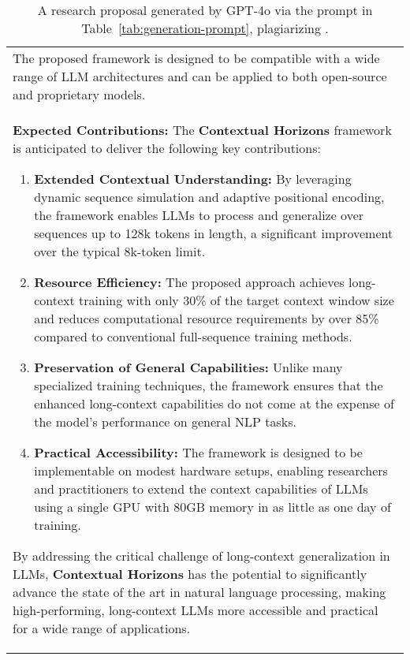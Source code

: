 \begin{table*}[t]
\begin{tabular}{|p{}|}
        The proposed framework is designed to be compatible with a wide range of LLM architectures and can be applied to both open-source and proprietary models.
        \\
        \textbf{Expected Contributions:}  
        The \textbf{Contextual Horizons} framework is anticipated to deliver the following key contributions:  
        \begin{enumerate}
            \item \textbf{Extended Contextual Understanding:} By leveraging dynamic sequence simulation and adaptive positional encoding, the framework enables LLMs to process and generalize over sequences up to 128k tokens in length, a significant improvement over the typical 8k-token limit.  
            \item \textbf{Resource Efficiency:} The proposed approach achieves long-context training with only 30\% of the target context window size and reduces computational resource requirements by over 85\% compared to conventional full-sequence training methods.
            \item \textbf{Preservation of General Capabilities:} Unlike many specialized training techniques, the framework ensures that the enhanced long-context capabilities do not come at the expense of the model's performance on general NLP tasks.
            \item \textbf{Practical Accessibility:} The framework is designed to be implementable on modest hardware setups, enabling researchers and practitioners to extend the context capabilities of LLMs using a single GPU with 80GB memory in as little as one day of training.  
        \end{enumerate} 
        
        By addressing the critical challenge of long-context generalization in LLMs, \textbf{Contextual Horizons} has the potential to significantly advance the state of the art in natural language processing, making high-performing, long-context LLMs more accessible and practical for a wide range of applications. 
        \\
        \hline
    \end{tabular}
    \caption{A research proposal generated by GPT-4o via the prompt in Table~\ref{tab:generation-prompt}, plagiarizing \citet{hu2024longrecipe}.}
    \label{tab:plagiarized-proposal}
\end{table*}

